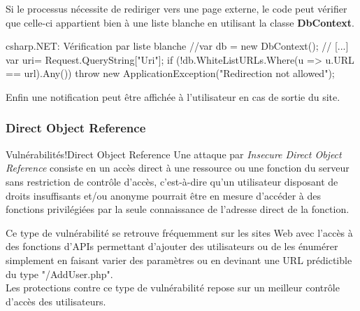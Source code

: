 Si le processus nécessite de rediriger vers une page externe, le code peut vérifier que celle-ci appartient bien à une liste blanche en utilisant la classe \textbf{DbContext}.
\begin{Config}{csharp}{.NET: Vérification par liste blanche}
//var db = new DbContext();
// [...]
var uri= Request.QueryString["Uri"];
if (!db.WhiteListURLs.Where(u => u.URL == url).Any()){
	throw new ApplicationException("Redirection not allowed");
}
\end{Config}

Enfin une notification peut être affichée à l'utilisateur en cas de sortie du site.


\subsubsection{Direct Object Reference}
\begin{Define}{Vulnérabilités!Direct Object Reference}
Une attaque par \textit{Insecure Direct Object Reference} consiste en un accès direct à une ressource ou une fonction du serveur sans restriction de contrôle d'accès, c'est-à-dire qu'un utilisateur disposant de droits insuffisants et/ou anonyme pourrait être en mesure d'accéder à des fonctions privilégiées par la seule connaissance de l'adresse direct de la fonction.
\end{Define}
Ce type de vulnérabilité se retrouve fréquemment sur les sites Web avec l'accès à des fonctions d'APIs permettant d'ajouter des utilisateurs ou de les énumérer simplement en faisant varier des paramètres ou en devinant une URL prédictible du type "/AddUser.php".\\
Les protections contre ce type de vulnérabilité repose sur un meilleur contrôle d'accès des utilisateurs.\\

